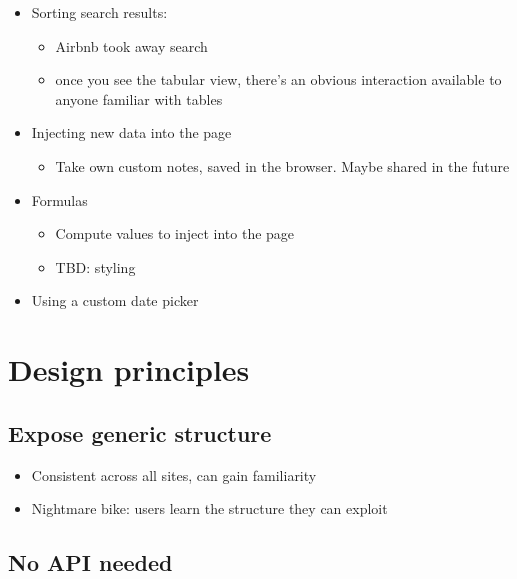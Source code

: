 \documentclass[english,submission]{programming}
\providecommand{\tightlist}{%
  \setlength{\itemsep}{0pt}\setlength{\parskip}{0pt}}
\begin{document}
\begin{itemize}
\tightlist
\item
  Sorting search results:

  \begin{itemize}
  \tightlist
  \item
    Airbnb took away search
  \item
    once you see the tabular view, there's an obvious interaction
    available to anyone familiar with tables
  \end{itemize}
\item
  Injecting new data into the page

  \begin{itemize}
  \tightlist
  \item
    Take own custom notes, saved in the browser. Maybe shared in the
    future
  \end{itemize}
\item
  Formulas

  \begin{itemize}
  \tightlist
  \item
    Compute values to inject into the page
  \item
    TBD: styling
  \end{itemize}
\item
  Using a custom date picker
\end{itemize}

\hypertarget{design-principles}{%
\section{Design principles}\label{design-principles}}

\hypertarget{expose-generic-structure}{%
\subsection{Expose generic structure}\label{expose-generic-structure}}

\begin{itemize}
\tightlist
\item
  Consistent across all sites, can gain familiarity
\item
  Nightmare bike: users learn the structure they can exploit
\end{itemize}

\hypertarget{no-api-needed}{%
\subsection{No API needed}\label{no-api-needed}}
\end{document}
